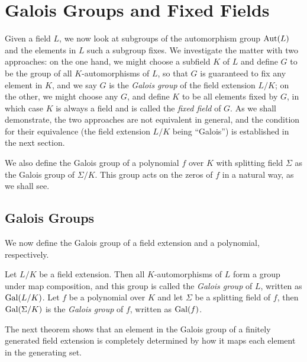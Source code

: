 \section{Galois Groups and Fixed Fields}
Given a field $L$, we now look at subgroups of the automorphism group $\operatorname{Aut}(L)$ and the elements in $L$ such a subgroup fixes. We investigate the matter with two approaches: on the one hand, we might choose a subfield $K$ of $L$ and define $G$ to be the group of all $K$-automorphisms of $L$, so that $G$ is guaranteed to fix any element in $K$, and we say $G$ is the \textit{Galois group} of the field extension $L/K$; on the other, we might choose any $G$, and define $K$ to be all elements fixed by $G$, in which case $K$ is always a field and is called the \textit{fixed field} of $G$. As we shall demonstrate, the two approaches are not equivalent in general, and the condition for their equivalence (the field extension $L/K$ being ``Galois'') is established in the next section. 

We also define the Galois group of a polynomial $f$ over $K$ with splitting field $\Sigma$ as the Galois group of $\Sigma / K$. This group acts on the zeros of $f$ in a natural way, as we shall see. 

\subsection{Galois Groups}


We now define the Galois group of a field extension and a polynomial, respectively.
\begin{definition}
    Let $L/K$ be a field extension. Then all $K$-automorphisms of $L$ form a group under map composition, and this group is called the \textit{Galois group} of $L$, written as \(\operatorname{Gal}(L/K)\).
	Let $f$ be a polynomial over $K$ and let $\Sigma$ be a splitting field of $f$, then $\operatorname{Gal}(\Sigma/K)$ is the \textit{Galois group} of $f$, written as \(\operatorname{Gal}(f)\).
	
\end{definition}

The next theorem shows that an element in the Galois group of a finitely generated field extension is completely determined by how it maps each element in the generating set. 


